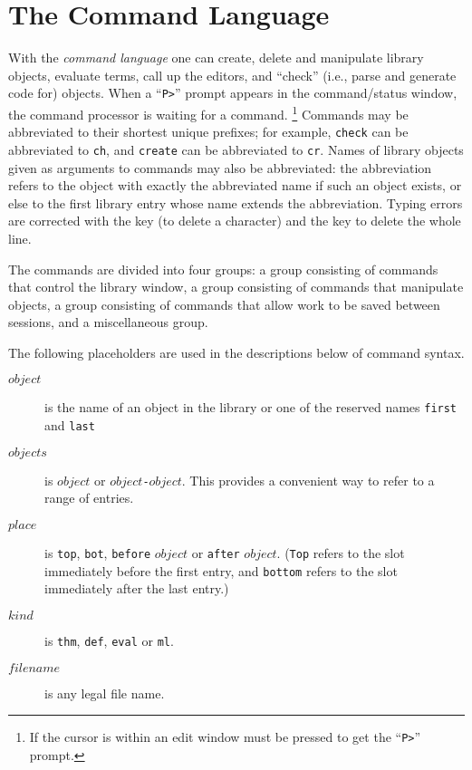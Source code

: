 \chapter{The Command Language}

With the {\em command language} one can
create, delete and manipulate library objects, evaluate terms, call up the
editors, and ``check'' (i.e., parse and generate code for) objects.
{}When a ``{\tt P>}''{} prompt appears in the command/status window,
the command processor is waiting for a command.%
{}%
\footnote{If the cursor is within an edit window \CMD{} must
be pressed to get the ``{\tt P>}'' prompt.}
Commands may be abbreviated to their shortest unique prefixes; for example,
{\tt check} can be abbreviated to {\tt ch}, and {\tt create} can be
abbreviated to {\tt cr}.  Names of library objects given as arguments to
commands may also be abbreviated: the abbreviation refers to the object
with exactly the abbreviated name if such an object exists, or else to the
first library entry whose name extends the abbreviation.  Typing errors
are corrected with the
\DEL{}{} key (to delete a character) and the \ERASE{}{} key to delete the
whole line.

The commands are divided into four groups:
a group consisting of commands that control the library window,
a group consisting of commands that manipulate objects,
a group consisting of commands that allow work to be saved between sessions,
and a miscellaneous group.

The following placeholders are used in the descriptions below
of command syntax.

\begin {description}
\item[$object$]{} is the name of an object in the library or one of the
    reserved names {\tt first} and {\tt last}

\item[$objects$]{} is $object$ or $object${\tt -}$object$.
    This provides a convenient way to refer to a range of entries.

\item[$place$]{} is {\tt top}, {\tt bot}, {\tt before} $object$ or
    {\tt after} $object$.
    ({\tt Top} refers to the slot immediately before the first entry,
    and {\tt bottom} refers to the slot immediately after the last entry.)

\item[$kind$]{} is {\tt thm}, {\tt def}, {\tt eval} or {\tt ml}.

\item[{$filename$}] is any legal file name.
  
\end {description}

